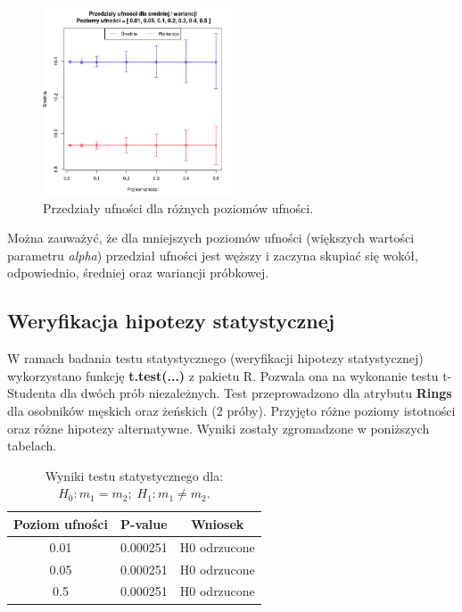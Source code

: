 \documentclass{scrartcl}
\begin{document}
\begin{figure}[H]
  \center
  \includegraphics[width=0.5\textwidth]{imgs/int_estim.png}
  \caption{Przedziały ufności dla różnych poziomów ufności.}
\end{figure}
Można zauważyć, że dla mniejszych poziomów ufności (większych wartości
parametru \textit{alpha}) przedział ufności jest węższy i zaczyna skupiać
się wokół, odpowiednio, średniej oraz wariancji próbkowej.

\pagebreak

\subsection{Weryfikacja hipotezy statystycznej}
W ramach badania testu statystycznego (weryfikacji hipotezy statystycznej) wykorzystano
funkcję \textbf{t.test(...)} z pakietu R. Pozwala ona na wykonanie testu t-Studenta dla
dwóch prób niezależnych. Test przeprowadzono dla atrybutu \textbf{Rings} dla osobników
męskich oraz żeńskich (2 próby). Przyjęto różne poziomy istotności oraz różne hipotezy
alternatywne. Wyniki zostały zgromadzone w poniższych tabelach.

\begin{table}[H]
  \center

  \begin{tabular}{|c|c|c|}
    \textbf{Poziom ufności} & \textbf{P-value} & \textbf{Wniosek} \\ \hline
    0.01                    & 0.000251         & H0 odrzucone \\
    0.05                    & 0.000251         & H0 odrzucone \\
    0.5                     & 0.000251         & H0 odrzucone \\
  \end{tabular}

  \caption{Wyniki testu statystycznego dla: $H_0: m_1 = m_2; \; H_1: m_1 \neq m_2$.}
\end{table}
\end{document}
